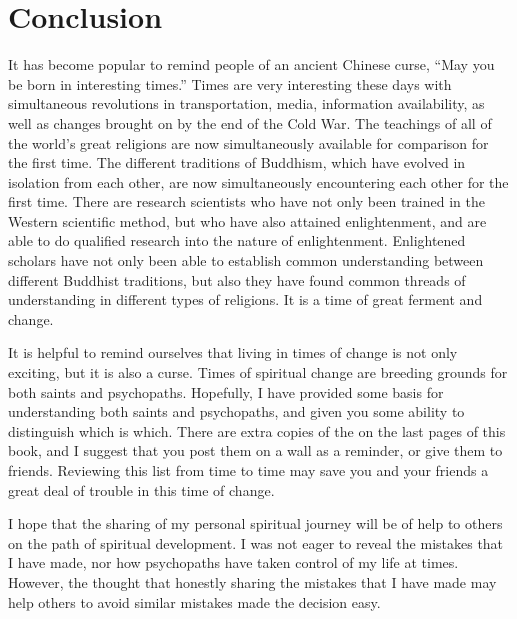 \documentclass[a5paper,10pt,english]{book}
\begin{document}
\section{Conclusion}
\label{\detokenize{saints:id3}}
\sphinxAtStartPar
It has become popular to remind people of an ancient Chinese curse, “May
you be born in interesting times.” Times are very interesting these days
with simultaneous revolutions in transportation, media, information
availability, as well as changes brought on by the end of the Cold War.
The teachings of all of the world’s great religions are now
simultaneously available for comparison for the first time. The
different traditions of Buddhism, which have evolved in isolation from
each other, are now simultaneously encountering each other for the first
time. There are research scientists who have not only been trained in
the Western scientific method, but who have also attained enlightenment,
and are able to do qualified research into the nature of enlightenment.
Enlightened scholars have not only been able to establish common
understanding between different Buddhist traditions, but also they have
found common threads of understanding in different types of religions.
It is a time of great ferment and change.

\sphinxAtStartPar
It is helpful to remind ourselves that living in times of change is not
only exciting, but it is also a curse. Times of spiritual change are
breeding grounds for both saints and psychopaths. Hopefully, I have
provided some basis for understanding both saints and psychopaths, and
given you some ability to distinguish which is which. There are extra
copies of the  on the last
pages of this book, and I suggest that you post them on a wall as a
reminder, or give them to friends. Reviewing this list from time to time
may save you and your friends a great deal of trouble in this time of
change.

\sphinxAtStartPar
I hope that the sharing of my personal spiritual journey will be of help
to others on the path of spiritual development. I was not eager to
reveal the mistakes that I have made, nor how psychopaths have taken
control of my life at times. However, the thought that honestly sharing
the mistakes that I have made may help others to avoid similar mistakes
made the decision easy.
\end{document}
